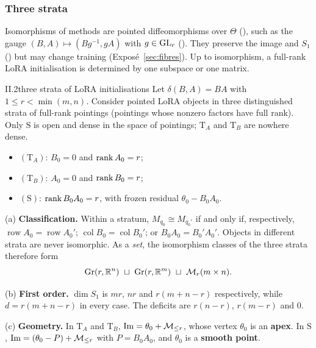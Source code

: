 \subsubsection{Three strata}\label{sec:strata-three}

Isomorphisms of methods are pointed diffeomorphisms over $\Theta$ (), such as the gauge
$(B,A)\mapsto(Bg^{-1},gA)$ with $g\in\GL_r$ (). They preserve the image and $S_1$
() but may change training (Exposé~\ref{sec:fibres}). Up to isomorphism, a full-rank LoRA
initialisation is determined by one subspace or one matrix.

\begin{theorem}{II.2}{three strata of LoRA initialisations}
Let $\delta(B,A)=BA$ with $1\le r<\min(m,n)$. Consider pointed LoRA objects in three distinguished strata of full-rank
pointings (pointings whose nonzero factors have full rank). Only $\mathrm S$ is open and dense in the space of
pointings; $\mathrm T_A$ and $\mathrm T_B$ are nowhere dense.
\begin{itemize}
  \item $(\mathrm T_A)$: $B_0=0$ and $\rk A_0=r$;
  \item $(\mathrm T_B)$: $A_0=0$ and $\rk B_0=r$;
  \item $(\mathrm S)$: $\rk B_0A_0=r$, with frozen residual $\theta_0-B_0A_0$.
\end{itemize}

(a) \textbf{Classification.} Within a stratum, $M_{q_0}\cong M_{q_0'}$ if and only if, respectively,
$\operatorname{row}A_0=\operatorname{row}A_0'$; $\operatorname{col}B_0=\operatorname{col}B_0'$; or $B_0A_0=B_0'A_0'$.
Objects in different strata are never isomorphic. As a \emph{set}, the isomorphism classes of the three strata
therefore form
\begin{equation}\label{eq:strata-moduli}
  \Gr(r,\R^n)\ \sqcup\ \Gr(r,\R^m)\ \sqcup\ \MM_r(m\times n).
\end{equation}

(b) \textbf{First order.} $\dim S_1$ is $mr$, $nr$ and $r(m+n-r)$ respectively, while $d=r(m+n-r)$ in every case. The
deficits are $r(n-r)$, $r(m-r)$ and $0$.

(c) \textbf{Geometry.} In $\mathrm T_A$ and $\mathrm T_B$, $\Im=\theta_0+\Mr$, whose vertex $\theta_0$ is an
\textbf{apex}. In $\mathrm S$, $\Im=(\theta_0-P)+\Mr$ with $P=B_0A_0$, and $\theta_0$ is a \textbf{smooth point}.


\end{theorem}
